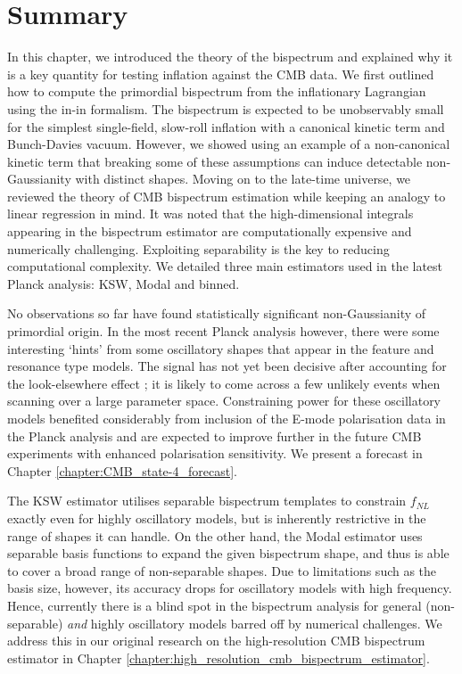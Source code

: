 \newpage
\section*{Summary}

In this chapter, we introduced the theory of the bispectrum and explained why it is a key quantity for testing inflation against the CMB data. We first outlined how to compute the primordial bispectrum from the inflationary Lagrangian using the in-in formalism. The bispectrum is expected to be unobservably small for the simplest single-field, slow-roll inflation with a canonical kinetic term and Bunch-Davies vacuum. However, we showed using an example of a non-canonical kinetic term that breaking some of these assumptions can induce detectable non-Gaussianity with distinct shapes. Moving on to the late-time universe, we reviewed the theory of CMB bispectrum estimation while keeping an analogy to linear regression in mind. It was noted that the high-dimensional integrals appearing in the bispectrum estimator are computationally expensive and numerically challenging. Exploiting separability is the key to reducing computational complexity. We detailed three main estimators used in the latest Planck analysis: KSW, Modal and binned.

No observations so far have found statistically significant non-Gaussianity of primordial origin. In the most recent Planck analysis however, there were some interesting `hints' from some oscillatory shapes that appear in the feature and resonance type models. The signal has not yet been decisive after accounting for the look-elsewhere effect \cite{Fergusson2015b,PlanckCollaboration2018}; it is likely to come across a few unlikely events when scanning over a large parameter space. Constraining power for these oscillatory models benefited considerably from inclusion of the E-mode polarisation data in the Planck analysis and are expected to improve further in the future CMB experiments with enhanced polarisation sensitivity. We present a forecast in Chapter \ref{chapter:CMB_state-4_forecast}.

The KSW estimator utilises separable bispectrum templates to constrain $f_{NL}$ exactly even for highly oscillatory models, but is inherently restrictive in the range of shapes it can handle. On the other hand, the Modal estimator uses separable basis functions to expand the given bispectrum shape, and thus is able to cover a broad range of non-separable shapes. Due to limitations such as the basis size, however, its accuracy drops for oscillatory models with high frequency. Hence, currently there is a blind spot in the bispectrum analysis for general (non-separable) \textit{and} highly oscillatory models barred off by numerical challenges. We address this in our original research on the high-resolution CMB bispectrum estimator in Chapter \ref{chapter:high_resolution_cmb_bispectrum_estimator}.